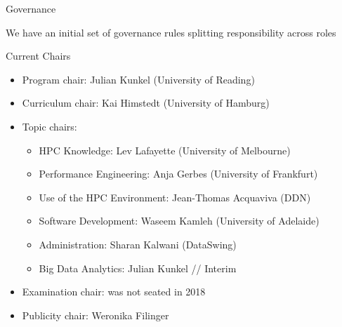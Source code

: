 \documentclass[compress,aspectratio=169]{beamer}
\begin{document}
\begin{frame}{Governance}

	\smallskip
  We have an initial set of governance rules splitting responsibility across roles

  \begin{block}{Current Chairs}
  \vspace*{-0.5em}
  \begin{itemize}
    \item Program chair: Julian Kunkel (University of Reading)
    \item Curriculum chair: Kai Himstedt (University of Hamburg)
    \item  Topic chairs:
    \begin{itemize}
      \item HPC Knowledge: Lev Lafayette (University of Melbourne)
      \item Performance Engineering: Anja Gerbes (University of Frankfurt)
      \item Use of the HPC Environment: Jean-Thomas Acquaviva (DDN)
      \item Software Development: Waseem Kamleh (University of Adelaide)
			\item Administration: Sharan Kalwani (DataSwing)
			\item Big Data Analytics: Julian Kunkel // Interim
    \end{itemize}
    \item Examination chair: was not seated in 2018
    \item Publicity chair: Weronika Filinger
  \end{itemize}
  \end{block}
\end{frame}
\end{document}
